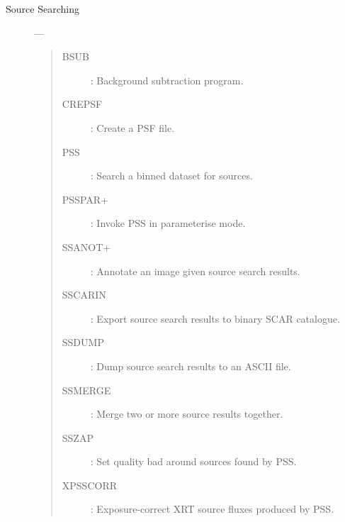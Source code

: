 \begin{description}
\item [Source Searching] ---
\begin{quote}
\begin{description}
\item [BSUB] :     Background subtraction program.
\item [CREPSF] :   Create a PSF file.
\item [PSS] :      Search a binned dataset for sources.
\item [PSSPAR+] :  Invoke PSS in parameterise mode.
\item [SSANOT+] :  Annotate an image given source search results.
\item [SSCARIN] :  Export source search results to binary SCAR catalogue.
\item [SSDUMP] :   Dump source search results to an ASCII file.
\item [SSMERGE] :  Merge two or more source results together.
\item [SSZAP] :    Set quality bad around sources found by PSS.
\item [XPSSCORR] : Exposure-correct XRT source fluxes produced by PSS.
\end{description}
\end{quote}


\end{description}
